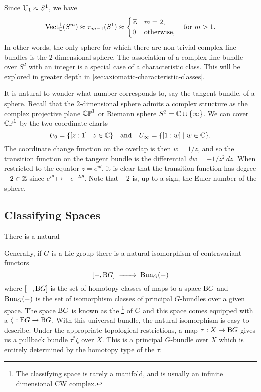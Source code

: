 \begin{example}
	Since $\mathrm{U}_1\approx S^1$, we have
	\[
		\operatorname{Vect}_{\mathbb{C}}^1(S^m) \approx \pi_{m-1}(S^1) \approx \begin{cases} \mathbb{Z} & m=2,\\ 0 & \textrm{otherwise},\end{cases}
		\quad\textrm{for }m >1.
	\]
	In other words, the only sphere for which there are non-trivial complex line bundles is the $2$-dimensional sphere. The association of a complex line bundle over $S^2$ with an integer is a special case of a characteristic class. This will be explored in greater depth in \cref{sec:axiomatic-characteristic-classes}.

	It is natural to wonder what number corresponds to, say the tangent bundle, of a sphere. Recall that the $2$-dimensional sphere admits a complex structure as the complex projective plane $\mathbb{CP}^1$ or Riemann sphere $S^2 = \mathbb{C}\cup\{\infty\}$. We can cover $\mathbb{CP}^1$ by the two coordinate charts
	\[
		U_0 = \{[z: 1] \mid z\in \mathbb{C}\}
		\quad\textrm{and}\quad
		U_\infty = \{[1: w] \mid w\in \mathbb{C}\}.
	\]
	The coordinate change function on the overlap is then $w=1/z$, and so the transition function on the tangent bundle is the differential $dw=-1/z^2 \,dz$. When restricted to the equator $z=e^{i\theta}$, it is clear that the transition function has degree $-2\in \mathbb{Z}$ since $e^{i\theta}\mapsto -e^{-2i\theta}$. Note that $-2$ is, up to a sign, the Euler number of the sphere.
\end{example}


\subsection{Classifying Spaces}\label{sec:classifying-spaces}

\begin{proposition}\label{prop:homotopy-invariance-vector-bundle}
	There is a natural
\end{proposition}

\begin{theorem}\label{thm:classifying-space}
\end{theorem}
	Generally, if $G$ is a Lie group there is a natural isomorphism of contravariant functors
	\[
		[-, \BB G] \lkxto \Bun_G(-)
	\]
	where $[-, \mathrm{B} G]$ is the set of homotopy classes of maps to a space $\mathrm{B} G$ and $\operatorname{Bun}_G(-)$ is the set of isomorphism classes of principal $G$-bundles over a given space.
	The space $\mathrm{B} G$ is known as the \footnote{The classifying space is rarely a manifold, and is usually an infinite dimensional CW complex.} of $G$ and this space comes equipped with a  $\zeta : \mathrm{E} G \to \mathrm{B} G$. With this universal bundle, the natural isomorphism is easy to describe. Under the appropriate topological restrictions, a map $\tau : X \to \mathrm{B} G$ gives us a pullback bundle $\tau^*\zeta$ over $X$. This is a principal $G$-bundle over $X$ which is entirely determined by the homotopy type of the  $\tau$.

